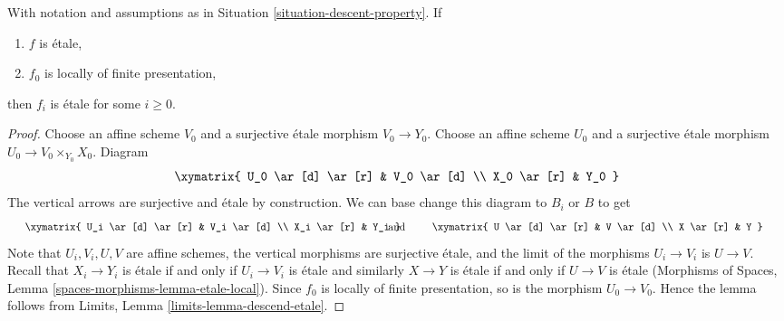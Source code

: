 \begin{lemma}
\label{lemma-descend-etale}
With notation and assumptions as in
Situation \ref{situation-descent-property}. If
\begin{enumerate}
\item $f$ is \'etale,
\item $f_0$ is locally of finite presentation,
\end{enumerate}
then $f_i$ is \'etale for some $i \geq 0$.
\end{lemma}

\begin{proof}
Choose an affine scheme $V_0$ and a surjective \'etale morphism
$V_0 \to Y_0$. Choose an affine scheme $U_0$ and a surjective \'etale
morphism $U_0 \to V_0 \times_{Y_0} X_0$. Diagram
$$
\xymatrix{
U_0 \ar[d] \ar[r] & V_0 \ar[d] \\
X_0 \ar[r] & Y_0
}
$$
The vertical arrows are surjective and \'etale by construction.
We can base change this diagram to $B_i$ or $B$ to get
$$
\vcenter{
\xymatrix{
U_i \ar[d] \ar[r] & V_i \ar[d] \\
X_i \ar[r] & Y_i
}
}
\quad\text{and}\quad
\vcenter{
\xymatrix{
U \ar[d] \ar[r] & V \ar[d] \\
X \ar[r] & Y
}
}
$$
Note that $U_i, V_i, U, V$ are affine schemes,
the vertical morphisms are surjective \'etale, and the limit of the
morphisms $U_i \to V_i$ is $U \to V$. Recall that $X_i \to Y_i$ is \'etale
if and only if $U_i \to V_i$ is
\'etale and similarly $X \to Y$ is \'etale if and only if
$U \to V$ is \'etale
(Morphisms of Spaces, Lemma \ref{spaces-morphisms-lemma-etale-local}).
Since $f_0$ is locally of finite
presentation, so is the morphism $U_0 \to V_0$. Hence the lemma follows
from Limits, Lemma \ref{limits-lemma-descend-etale}.
\end{proof}
